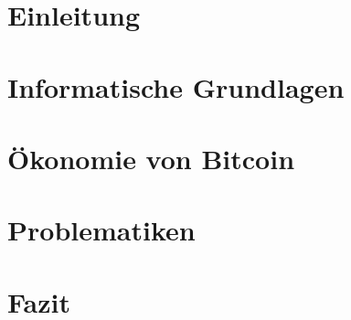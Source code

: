 \chapter{Einleitung}

\chapter{Informatische Grundlagen}



\chapter{Ökonomie von Bitcoin}



\chapter{Problematiken}

\chapter{Fazit}

